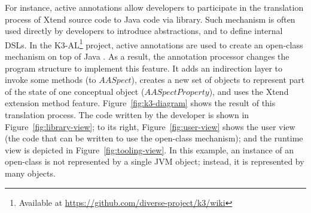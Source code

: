 For instance, active annotations allow developers to participate in the translation process of Xtend source code to Java code via library.
Such mechanism is often used directly by developers to introduce abstractions, and to define internal DSLs.
In the K3-AL\footnote{Available at \url{https://github.com/diverse-project/k3/wiki}} project, active annotations are used to create an open-class mechanism on top of Java \cite{Clifton:2000:MMO:353171.353181}. 
As a result, the annotation processor changes the program structure to implement this feature. 
It adds an indirection layer to invoke some methods (to $AASpect$), creates a new set of objects to represent part of the state of one conceptual object ($AASpectProperty$), and uses the Xtend extension method feature.
Figure~\ref{fig:k3-diagram} shows the result of this translation process. 
The code written by the developer is shown in Figure~\ref{fig:library-view}; to its right, Figure~\ref{fig:user-view} shows the user view (the code that can be written to use the open-class mechanism); and the runtime view is depicted in Figure~\ref{fig:tooling-view}.
In this example, an instance of an open-class is not represented by a single JVM object; instead, it is represented by many objects.  


